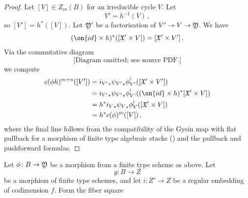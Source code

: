 \begin{proof}
Let $[V] \in Z_m(B)$ for an
 irreducible cycle $V$. Let $$V' = h^{-1}(V)\, ,$$ so
$[V'] = h^*([V])$. Let $\frak Y'$ be a factorisation of $V' \to V \to \frak Y$. We have
$$(\on{id}\times h)^*([\frak X' \times V]) = [\frak X' \times V']\, .$$
Via the commutative diagram
\begin{equation}
    \text{[Diagram omitted; see source PDF.]}
\end{equation}
we compute
\begin{align*}
     c(\phi h)^{m+n} ([V']) &= {i_{V'}}_* {\psi_{V'}}_* \phi_{V'}^! ([\frak X' \times V']) \\
    &= {i_{V'}}_* {\psi_{V'}}_* \phi_{V'}^! ( (\on{id} \times h)^* [\frak X' \times V]) \\
    &= h^* {i_V}_* {\psi_V}_* \phi_V^! ( [\frak X' \times V]) \\
    &=  h^* c(\phi)^m([V])\, ,
\end{align*}
where the final line follows from the compatibility of the Gysin map with flat pullback for a morphism of finite type algebraic stacks (\cite[Section 3.1]{Kresch1999Cycle-groups-fo}) and the pullback and pushforward formulas. %
\end{proof}



Let $\phi\colon B \to \frak Y$ be a morphism from a finite type scheme
as above. Let $$g\colon B \to Z$$ be a morphism of finite type schemes, and let $i\colon Z' \to Z$ be a regular embedding of codimension $f$.
Form the fiber square


